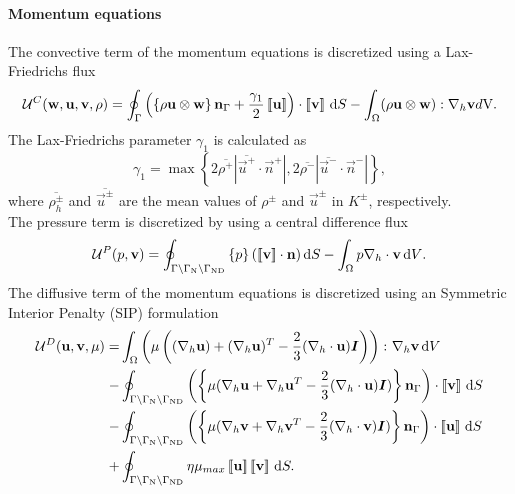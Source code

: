 \paragraph{Momentum equations}
The convective term of the momentum equations is discretized using a Lax-Friedrichs flux
\begin{equation}
	\mathcal{U}^C(\textbf{w},\textbf{u},\textbf{v}, \rho)=  \oint_{\Gamma}{\left( \left\{{\rho\textbf{u}\otimes\textbf{w} }\right\}\textbf{n}_\Gamma + \frac{\gamma_1}{2}\left[\!\left[{{\textbf{u}}}\right]\!\right]\right)\cdot\left[\!\left[{{\textbf{v}}}\right]\!\right] \,\mathrm{d} S}
	-\int_{\Omega}({\rho\textbf{u}\otimes\textbf{w}}):\nabla_h\textbf{v} d\text{V}.
	\label{eq:Mom_convective}\\
\end{equation}
The Lax-Friedrichs parameter $\gamma_1$ is calculated as \cite{kleinHighorderDiscontinuousGalerkin2016}
\begin{equation}
	\gamma_1  = \max \left\{2 \overline{\rho^+} |\overline{\vec{u}^+} \cdot \vec{n}^+|,2 \overline{\rho^-} |\overline{\vec{u}^-} \cdot \vec{n}^-|\right\},
	\label{eq:vardens_lambda}
\end{equation}
where $\overline{\rho_{h}^\pm}$ and $\overline{\vec{u}^\pm}$ are the mean values of $\rho^\pm$ and $\vec{u}^\pm$ in $K^\pm$, respectively.\\
The pressure term is discretized by using a central difference flux
\begin{equation}
	\mathcal{U}^P(p,\textbf{v})=  \oint_{\Gamma \setminus \Gamma_{\text{N}}\setminus \Gamma_{\text{ND}}}{ \left\{{p}\right\}(\left[\!\left[{{\textbf{v}}}\right]\!\right]\cdot \textbf{n} )\,\mathrm{d} S}
	- \int_{\Omega}{p \nabla_h \cdot \textbf{v} \,\mathrm{d} V}. \label{eq:Mom_pressure}
\end{equation}
The diffusive term of the momentum equations is discretized using an Symmetric Interior Penalty (SIP)  formulation \cite{shahbaziExplicitExpressionPenalty2005}
\begin{equation}
	\begin{aligned}
		\mathcal{U}^D(\vec{u},\vec{v},\mu) =
		  & \int_{\Omega}{\left(\mu\left((\nabla_h \vec{u}) + (\nabla_h \vec{u})^T - \frac{2}{3}(\nabla_h\cdot \vec{u})\mytensor{I} \right)\right)\colon \nabla_h\vec{v}} \dV \\
		- & \oint_{\Gamma \setminus \Gamma_{\text{N}}\setminus \Gamma_{\text{ND}}}
		\left(\mean{\mu(\nabla_h\vec{u} + \nabla_h\vec{u}^T - \frac{2}{3}(\nabla_h\cdot \vec{u})\mytensor{I})}\normalBoundary\right)\cdot\jump{\vec{v}}\dS                    \\
		- & \oint_{\Gamma \setminus \Gamma_{\text{N}}\setminus \Gamma_{\text{ND}}}
		\left(\mean{\mu(\nabla_h\vec{v} + \nabla_h\vec{v}^T - \frac{2}{3}(\nabla_h\cdot \vec{v})\mytensor{I})}\normalBoundary\right)\cdot\jump{\vec{u}} \dS                   \\
		+ & \oint_{\Gamma \setminus \Gamma_{\text{N}}\setminus \Gamma_{\text{ND}}} \eta \mu_{max} \jump{\vec{u}} \jump{\vec{v}}\dS.
		\label{eq:Mom_diffusive}
	\end{aligned}
\end{equation}
